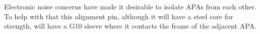 Electronic noise concerns have made it desirable to isolate APAs from each other.  To help with that this alignment pin, although it will have a steel core for strength, will have a G10 sleeve where it contacts the frame of the adjacent APA.




%
%
%
%
%
%
%
%
%
%
%
%
